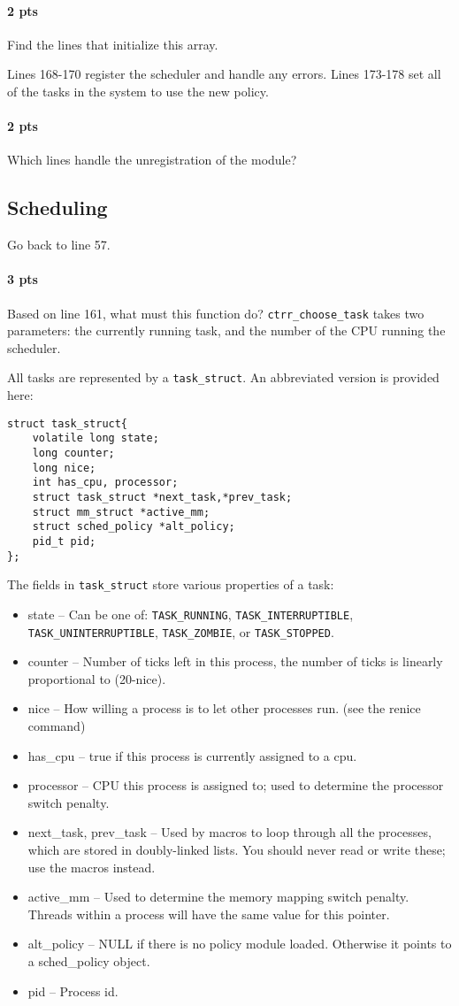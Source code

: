\documentclass[letterpaper,10pt]{article}
\begin{document}
\paragraph{2 pts} Find the lines that initialize this array.

Lines 168-170 register the scheduler and handle any errors. Lines 173-178 set all of the
tasks in the system to use the new policy.
\paragraph{2 pts} Which lines handle the unregistration of the module?

\subsection{Scheduling}
Go back to line 57.

\paragraph{3 pts} Based on line 161, what must this function do?
\verb=ctrr_choose_task= takes two parameters: the currently running task, and the number of
the CPU running the scheduler.

All tasks are represented by a \verb=task_struct=. An abbreviated version is provided here:
\begin{verbatim}
struct task_struct{
    volatile long state;
    long counter;
    long nice;
    int has_cpu, processor;
    struct task_struct *next_task,*prev_task;
    struct mm_struct *active_mm;
    struct sched_policy *alt_policy;
    pid_t pid;
};
\end{verbatim}
The fields in \verb=task_struct= store various properties of a task:
\begin{itemize}
 \item state -- Can be one of: \verb=TASK_RUNNING=, \verb=TASK_INTERRUPTIBLE=,
  \verb=TASK_UNINTERRUPTIBLE=, \verb=TASK_ZOMBIE=, or \verb=TASK_STOPPED=.
 \item counter -- Number of ticks left in this process, the number of ticks is linearly proportional
  to (20-nice).
 \item nice -- How willing a process is to let other processes run. (see the renice command)
 \item has\_cpu -- true if this process is currently assigned to a cpu.
 \item processor -- CPU this process is assigned to; used to determine the processor switch penalty.
 \item next\_task, prev\_task -- Used by macros to loop through all the processes, which are stored
  in doubly-linked lists. You should never read or write these; use the macros instead.
 \item active\_mm -- Used to determine the memory mapping switch penalty. Threads within a process
  will have the same value for this pointer.
 \item alt\_policy -- NULL if there is no policy module loaded. Otherwise it points to a
  sched\_policy object.
 \item pid -- Process id.
\end{itemize}
\end{document}
